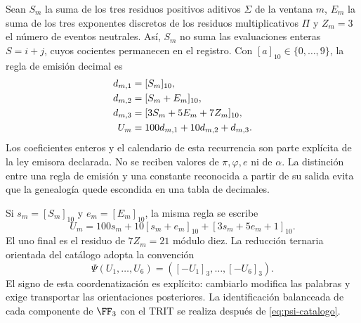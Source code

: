 Sean \(S_m\) la suma de los tres residuos positivos aditivos \(\Sigma\) de la ventana \(m\), \(E_m\) la suma de los tres exponentes discretos de los residuos multiplicativos \(\Pi\) y \(Z_m=3\) el número de eventos neutrales. Así, \(S_m\) no suma las evaluaciones enteras \(S=i+j\), cuyos cocientes permanecen en el registro. Con \([a]_{10}\in\{0,\ldots,9\}\), la regla de emisión decimal es
\begin{align}
 d_{m,1}&=[S_m]_{10},\notag\\
 d_{m,2}&=[S_m+E_m]_{10},\notag\\
 d_{m,3}&=[3S_m+5E_m+7Z_m]_{10},\notag\\
 U_m&=100d_{m,1}+10d_{m,2}+d_{m,3}.
 \label{eq:emisor-seis}
\end{align}
Los coeficientes enteros y el calendario de esta recurrencia son parte explícita de la ley emisora declarada. No se reciben valores de \(\pi,\varphi,e\) ni de \(\alpha\). La distinción entre una regla de emisión y una constante reconocida a partir de su salida evita que la genealogía quede escondida en una tabla de decimales.

Si \(s_m=[S_m]_{10}\) y \(e_m=[E_m]_{10}\), la misma regla se escribe
\begin{equation}
 U_m=100s_m+10[s_m+e_m]_{10}+[3s_m+5e_m+1]_{10}.
 \label{eq:acoplamiento}
\end{equation}
El uno final es el residuo de \(7Z_m=21\) módulo diez. La reducción ternaria orientada del catálogo adopta la convención
\begin{equation}
 \Psi(U_1,\ldots,U_6)=([-U_1]_3,\ldots,[-U_6]_3).
 \label{eq:psi-catalogo}
\end{equation}
El signo de esta coordenatización es explícito: cambiarlo modifica las palabras y exige transportar las orientaciones posteriores. La identificación balanceada de cada componente de \(\FF_3\) con el TRIT se realiza después de \eqref{eq:psi-catalogo}.

